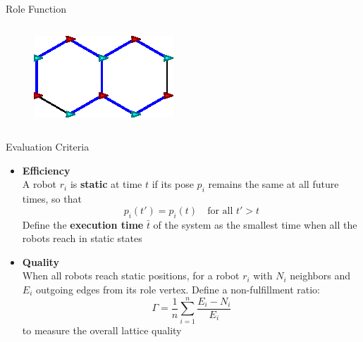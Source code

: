 \documentclass[10pt]{beamer}
\begin{document}
\begin{frame}{Role Function}
\begin{columns}[T]
\begin{column}{.5\textwidth}
\begin{figure}
      \end{figure}
      \begin{figure}
        \centering
        \includegraphics[scale=0.8]{figs/good-hexagon}
        \end{figure}
    \end{column}%
  \end{columns}
\end{frame}

\begin{frame}{Evaluation Criteria}
  \begin{itemize}
  \item \textbf{Efficiency}\\
    A robot $r_i$ is \textbf{static} at time $t$ if its pose $p_i$
    remains the same at all future times, so that 
    $$p_i(t') = p_i(t) \quad \mbox {for all } t' > t$$    
  Define the \textbf{execution time} $\bar{t}$ of the system as the smallest time
  when all the robots reach in static states
  \item \textbf{Quality} \\
    When all robots reach static positions, for a robot $r_i$
    with $N_i$ neighbors and $E_i$ outgoing edges from its role vertex. 
    Define a non-fulfillment ratio:
    $$\Gamma = \dfrac{1}{n}\sum\limits_{i=1}^n \frac{E_i - N_i}{E_i}$$
    to measure the overall lattice quality
  \end{itemize}
  
\end{frame}
\end{document}
